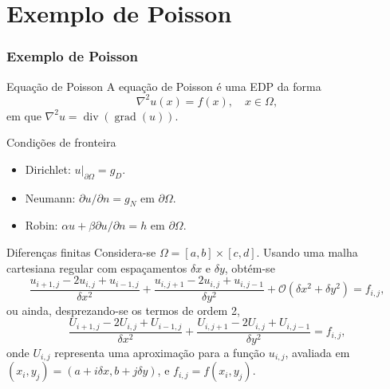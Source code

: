 \documentclass[../main/main.tex]{subfiles}
\begin{document}
\section{Exemplo de Poisson}





\begin{frame}
	\frametitle{Exemplo de Poisson}
\end{frame}




\begin{frame}{Equação de Poisson}
	A equação de Poisson é uma EDP da forma\[
		\nabla^2 u(x) = f(x),\quad x\in\Omega,
	\] em que $\nabla^2 u = \operatorname{div}(\operatorname{grad}(u))$.
\end{frame}

\begin{frame}{Condições de fronteira}
	\begin{itemize}
		\item Dirichlet: $u|_{\partial\Omega} = g_D$.
		\item Neumann: $\partial u/\partial n = g_N$ em $\partial\Omega$.
		\item Robin: $\alpha u + \beta\partial u/\partial n = h$ em $\partial\Omega$.
	\end{itemize}
\end{frame}

\begin{frame}{Diferenças finitas}
	Considera-se $\Omega = [a,b]\times[c,d]$. Usando uma malha cartesiana regular com espaçamentos $\delta x$ e $\delta y$, obtém-se\[
		\frac{u_{i+1,j}-2u_{i,j}+u_{i-1,j}}{\delta x^{2}}+\frac{u_{i,j+1}-2u_{i,j}+u_{i,j-1}}{\delta y^{2}}+\mathcal{O}(\delta x^{2}+\delta y^{2})=f_{i,j},
	\]\pause
	ou ainda, desprezando-se os termos de ordem 2,
	\[
		\frac{U_{i+1,j}-2U_{i,j}+U_{i-1,j}}{\delta x^{2}}+\frac{U_{i,j+1}-2U_{i,j}+U_{i,j-1}}{\delta y^{2}}=f_{i,j},
	\]\pause
	onde $U_{i,j}$ representa uma aproximação para a função $u_{i,j}$, avaliada em $(x_{i},y_{j}) = (a+i\delta x, b+j\delta y)$, e $f_{i,j}=f(x_i, y_j)$.
\end{frame}
\end{document}

